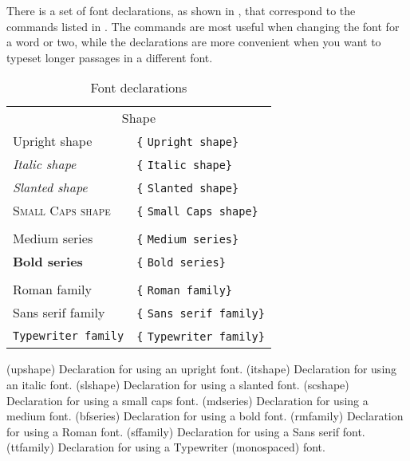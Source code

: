     There is a set of font declarations, as shown in ,
that correspond to the commands listed in . The commands
are most useful when changing the font for a word or two, while the 
declarations are more convenient when you want to typeset longer passages
in a different font.

\begin{table}
\centering
\caption{Font declarations} \label{tab:fontdecl}
\begin{tabular}{ll} \toprule
\multicolumn{2}{c}{Shape}\index{font characteristic!shape} \\ \addlinespace
\textup{Upright shape}     & \verb?{?\cmd{\upshape} \verb?Upright shape}? \\
\textit{Italic shape}      & \verb?{?\cmd{\itshape} \verb?Italic shape}? \\
\textsl{Slanted shape}     & \verb?{?\cmd{\slshape} \verb?Slanted shape}? \\
\textsc{Small Caps shape}  & \verb?{?\cmd{\scshape} \verb?Small Caps shape}? \\ \addlinespace
\multicolumn{2}{c}{Series or weight}\index{font characteristic!series} \\ \addlinespace
\textmd{Medium series}     & \verb?{?\cmd{\mdseries} \verb?Medium series}? \\
\textbf{Bold series}       & \verb?{?\cmd{\bfseries} \verb?Bold series}? \\ \addlinespace
\multicolumn{2}{c}{Family}\index{font characteristic!family} \\ \addlinespace
\textrm{Roman family}      & \verb?{?\cmd{\rmfamily} \verb?Roman family}? \\ 
\textsf{Sans serif family} & \verb?{?\cmd{\sffamily} \verb?Sans serif family}? \\ 
\texttt{Typewriter family} & \verb?{?\cmd{\ttfamily} \verb?Typewriter family}? \\ 
\bottomrule
\end{tabular}
\glossary(upshape)%
  {}%
  {Declaration for using an upright font.}
\glossary(itshape)%
  {}%
  {Declaration for using an italic font.}
\glossary(slshape)%
  {}%
  {Declaration for using a slanted font.}
\glossary(scshape)%
  {}%
  {Declaration for using a small caps font.}
\glossary(mdseries)%
  {}%
  {Declaration for using a medium font.}
\glossary(bfseries)%
  {}%
  {Declaration for using a bold font.}
\glossary(rmfamily)%
  {}%
  {Declaration for using a Roman font.}
\glossary(sffamily)%
  {}%
  {Declaration for using a Sans serif font.}
\glossary(ttfamily)%
  {}%
  {Declaration for using a Typewriter (monospaced) font.}
\end{table}

